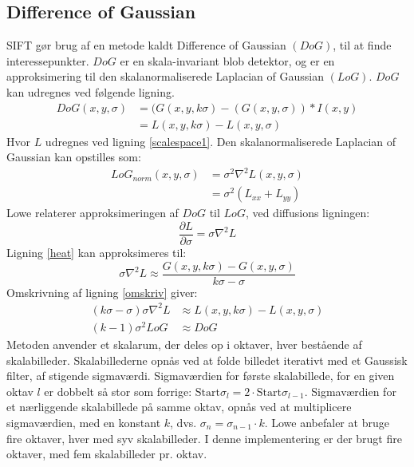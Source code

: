 \subsection{Difference of Gaussian}
\label{sec:dog}
SIFT gør brug af en metode kaldt Difference of Gaussian $(DoG)$, til at finde interessepunkter. $DoG$ er en skala-invariant blob detektor, og er en approksimering til den skalanormaliserede Laplacian of Gaussian $(LoG)$. $DoG$ kan udregnes ved følgende ligning.
\begin{equation}
\begin{split}
DoG(x,y,\sigma) &= (G(x,y,k\sigma)-(G(x,y,\sigma))\ast I(x,y) \\
           &= L(x,y,k \sigma)-L(x,y,\sigma)
\end{split}
\label{dog}
\end{equation}
Hvor $L$ udregnes ved ligning \eqref{scalespace1}.
Den skalanormaliserede Laplacian of Gaussian kan opstilles som:
\begin{equation}
\begin{split}
LoG_{norm}(x,y,\sigma)&=\sigma^2\nabla^2L(x,y,\sigma) \\
&= \sigma^2(L_{xx}+L_{yy})
\end{split}
\end{equation}
Lowe relaterer approksimeringen af $DoG$ til $LoG$, ved diffusions ligningen:
\begin{equation}
\dfrac{\partial L}{\partial \sigma} = \sigma \nabla^2L
\label{heat}
\end{equation}
Ligning \eqref{heat} kan approksimeres til:
\begin{equation}
\sigma \nabla^2L \approx \frac{G(x,y,k\sigma) - G(x,y,\sigma)}{k\sigma-\sigma}
\label{omskriv}
\end{equation}
Omskrivning af ligning \eqref{omskriv} giver:
\begin{equation}
\begin{split}
(k\sigma-\sigma)\sigma\nabla^2L &\approx L(x,y,k\sigma)-L(x,y,\sigma) \\
(k-1)\sigma^2LoG &\approx DoG
\end{split}
\end{equation}
Metoden anvender et skalarum, der deles op i oktaver, hver bestående af skalabilleder. Skalabillederne opnås ved at folde billedet iterativt med et Gaussisk filter, af stigende sigmaværdi. Sigmaværdien for første skalabillede, for en given oktav $l$ er dobbelt så stor som forrige: $\text{Start} \sigma_l = 2 \cdot \text{Start} \sigma_{l-1}$. Sigmaværdien for et nærliggende skalabillede på samme oktav, opnås ved at multiplicere sigmaværdien, med en konstant $k$, dvs. $\sigma_n = \sigma_{n-1} \cdot k$. Lowe anbefaler at bruge fire oktaver, hver med syv skalabilleder. I denne implementering er der brugt fire oktaver, med fem skalabilleder pr. oktav.


